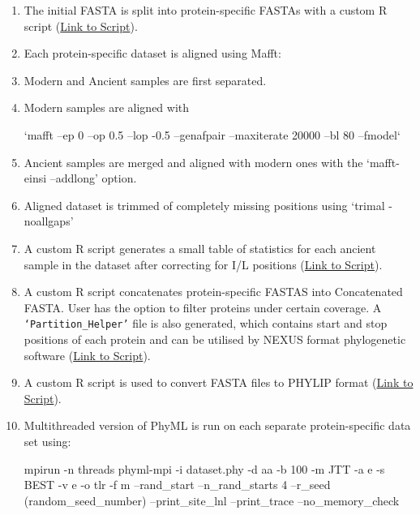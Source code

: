 \documentclass{book}
\begin{document}
\begin{enumerate}

\item The initial FASTA is split into protein-specific FASTAs with a custom R script (\href{https://github.com/johnpatramanis/Proteomic_Pipeline/blob/main/Dataset_Analysis/Rscripts/Rscript1.r}{Link to Script}).

\item Each protein-specific dataset is aligned using Mafft:
\item Modern and Ancient samples are first separated.
\item Modern samples are aligned with \begin{spverbatim} ‘mafft --ep 0 --op 0.5 --lop -0.5 --genafpair --maxiterate 20000 --bl 80 --fmodel‘ \end{spverbatim}
\item Ancient samples are merged and aligned with modern ones with the ‘mafft-einsi  --addlong’ option.
\item Aligned dataset is trimmed of completely missing positions using  ‘trimal -noallgaps’

\item A custom R script generates a small table of  statistics for each ancient sample in the dataset after correcting for I/L positions (\href{https://github.com/johnpatramanis/Proteomic_Pipeline/blob/main/Dataset_Analysis/Rscripts/Rscript2.r}{Link to Script}). 

\item A custom R script concatenates protein-specific FASTAS into Concatenated FASTA. User has the option to filter proteins under certain coverage. A \verb| ‘Partition_Helper’| file is also generated, which contains start and stop positions of each protein and can be utilised by NEXUS format phylogenetic software (\href{https://github.com/johnpatramanis/Proteomic_Pipeline/blob/main/Dataset_Analysis/Rscripts/Rscript3.r}{Link to Script}).

\item A custom R script is used to convert FASTA files to PHYLIP format (\href{https://github.com/johnpatramanis/Proteomic_Pipeline/blob/main/Dataset_Analysis/Rscripts/Rscript4.r}{Link to Script}).

\item Multithreaded version of PhyML is run on each separate protein-specific data set using:
\begin{spverbatim}
mpirun -n threads phyml-mpi -i dataset.phy -d aa -b 100 -m JTT -a e -s BEST -v e -o tlr -f m --rand_start --n_rand_starts 4 --r_seed (random_seed_number) --print_site_lnl --print_trace --no_memory_check 
\end{spverbatim}


\end{enumerate}
\end{document}
